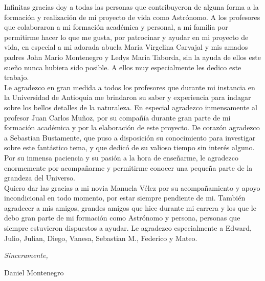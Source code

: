 \begin{acknowledgements}      

Infinitas gracias doy a todas las personas que contribuyeron de alguna forma a la formación y realización de mi proyecto de vida como Astrónomo. A los profesores que colaboraron a mi formación académica y personal, a mi familia por permitirme hacer lo que me gusta, por patrocinar y ayudar en mi proyecto de vida, en especial a mi adorada abuela Maria Virgelina Carvajal y mis amados padres  John Mario Montenegro y Ledys Maria Taborda, sin la ayuda de ellos este sueño nunca hubiera sido posible. A ellos muy especialmente les dedico este trabajo. \\

Le agradezco en gran medida a todos los profesores que durante mi instancia en la Universidad de Antioquia me brindaron su saber y experiencia para indagar sobre los bellos detalles de la naturaleza. En especial agradezco inmensamente al profesor Juan Carlos Mu\~noz, por su compañía durante gran parte de mi formación académica y por la elaboración de este proyecto. De corazón agradezco a Sebastian Bustamente, que puso a disposición su conocimiento para investigar sobre este fantástico tema, y que dedicó de su valioso tiempo sin interés alguno. Por su inmensa paciencia y su pasión a la hora de enseñarme, le agradezco enormemente por acompañarme y permitirme conocer una pequeña parte de la grandeza del Universo. \\

Quiero dar las gracias a mi novia Manuela Vélez por su acompañamiento y apoyo incondicional en todo momento, por estar siempre pendiente de mi. También agradecer a mis amigos, grandes amigos que hice durante mi carrera y los que le debo gran parte de mi formación como Astrónomo y persona, personas que siempre estuvieron dispuestos a ayudar. Le agradezco especialmente a Edward, Julio, Julian, Diego, Vanesa, Sebastian M., Federico y Mateo. 
 


\begin{flushright}
\textit{Sinceramente,}


Daniel Montenegro


\monthname \ \the\year
\end{flushright}


\end{acknowledgements}

